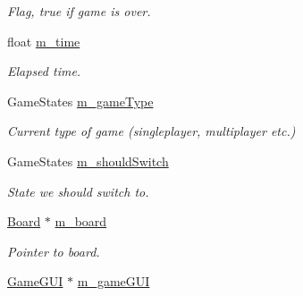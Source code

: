 \begin{DoxyCompactItemize}
\begin{DoxyCompactList}\small\item\em Flag, true if game is over. \end{DoxyCompactList}\item 
float \hyperlink{classMultiplayer__State_aeb3f99f3a6f9393dfad441a5d59a97db}{m\+\_\+time}\hypertarget{classMultiplayer__State_aeb3f99f3a6f9393dfad441a5d59a97db}{}\label{classMultiplayer__State_aeb3f99f3a6f9393dfad441a5d59a97db}

\begin{DoxyCompactList}\small\item\em Elapsed time. \end{DoxyCompactList}\item 
Game\+States \hyperlink{classMultiplayer__State_a119977c4f338bc835523ceb16d45729a}{m\+\_\+game\+Type}\hypertarget{classMultiplayer__State_a119977c4f338bc835523ceb16d45729a}{}\label{classMultiplayer__State_a119977c4f338bc835523ceb16d45729a}

\begin{DoxyCompactList}\small\item\em Current type of game (singleplayer, multiplayer etc.) \end{DoxyCompactList}\item 
Game\+States \hyperlink{classMultiplayer__State_af7bba604ecf1a47833746ea7e2218b22}{m\+\_\+should\+Switch}\hypertarget{classMultiplayer__State_af7bba604ecf1a47833746ea7e2218b22}{}\label{classMultiplayer__State_af7bba604ecf1a47833746ea7e2218b22}

\begin{DoxyCompactList}\small\item\em State we should switch to. \end{DoxyCompactList}\item 
\hyperlink{classBoard}{Board} $\ast$ \hyperlink{classMultiplayer__State_a6f08900f79e099996db28046b32a7af5}{m\+\_\+board}\hypertarget{classMultiplayer__State_a6f08900f79e099996db28046b32a7af5}{}\label{classMultiplayer__State_a6f08900f79e099996db28046b32a7af5}

\begin{DoxyCompactList}\small\item\em Pointer to board. \end{DoxyCompactList}\item 
\hyperlink{classGameGUI}{Game\+G\+UI} $\ast$ \hyperlink{classMultiplayer__State_a057227b0d6e3b56bdeaad2f76b400be1}{m\+\_\+game\+G\+UI}\hypertarget{classMultiplayer__State_a057227b0d6e3b56bdeaad2f76b400be1}{}\label{classMultiplayer__State_a057227b0d6e3b56bdeaad2f76b400be1}


\end{DoxyCompactItemize}
